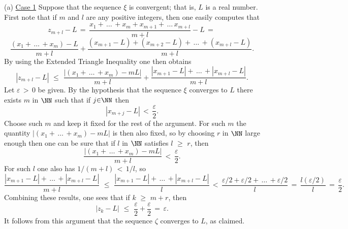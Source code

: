 {        (a) \underline{Case 1} Suppose that the sequence ${\xi}$ is convergent; that is, $L$ is a real number.
    First note that if $m$ and $l$ are any positive integers, then one easily computes that
        \begin{displaymath}
        z_{m+l}-L \,=\, \frac{x_{1}+ \,{\ldots}\,+x_{m} + x_{m+1} + \,{\ldots}\,x_{m+l}}{m+l} - L \,=\, 
        \end{displaymath}
        \begin{displaymath}
    \frac{(x_{1}+\,{\ldots}\,+x_{m})-L}{m+l} + \frac{(x_{m+1}-L) + (x_{m+2}-L) + \,{\ldots}\,+ (x_{m+l}-L)}{m+l}.
        \end{displaymath}
    By using the Extended Triangle Inequality one then obtains
        \begin{displaymath}
        |z_{m+l}-L|\,\,{\leq}\,\,\frac{|(x_{1}+\,{\ldots}\,+x_{m})-mL|}{m+l} + 
    \frac{|x_{m+1}-L| + \,{\ldots}\, + |x_{m+l}-L|}{m+l}.
        \end{displaymath}
    Let ${\varepsilon}\,>\,0$ be given. By the hypothesis that the sequence ${\xi}$ converges to $L$ there exists $m$ in ${\NN}$ such that if $j{\in}{\NN}$ then
        \begin{displaymath}
        |x_{m+j}-L|\,<\,\frac{{\varepsilon}}{2}.
        \end{displaymath}
   Choose such $m$ and keep it fixed for the rest of the argument. For such $m$ the quantity $|(x_{1}+\,{\ldots}\,+x_{m})-mL|$ is then also fixed,
    so by choosing $r$ in ${\NN}$ large enough then one can be sure that if $l$ in ${\NN}$ satisfies $l\,\,{\geq}\,\,r$, then
        \begin{displaymath}
        \frac{|(x_{1}+\,{\ldots}\,+x_{m})-mL|}{m+l}\,<\,\frac{{\varepsilon}}{2}.
        \end{displaymath}
    For such $l$ one also has $1/(m+l)\,<\,1/l$, so
        \begin{displaymath}
        \frac{|x_{m+1}-L| + \,{\ldots}\, + |x_{m+l}-L|}{m+l}\,\,{\leq}\,\,
    \frac{|x_{m+1}-L| + \,{\ldots}\, + |x_{m+l}-L|}{l}\,<\,\frac{{\varepsilon}/2+{\varepsilon}/2+\,{\ldots}\,+{\varepsilon}/2}{l} \,=\, \frac{l({\varepsilon}/2)}{l} \,=\, \frac{{\varepsilon}}{2}.
        \end{displaymath}
    Combining these results, one sees that if $k\,\,{\geq}\,\,m+r$, then
        \begin{displaymath}
        |z_{k}-L|\,\,{\leq}\,\,\frac{{\varepsilon}}{2} + \frac{{\varepsilon}}{2} \,=\, {\varepsilon}.
        \end{displaymath}
    It follows from this argument that the sequence ${\zeta}$ converges to $L$, as claimed.

}
